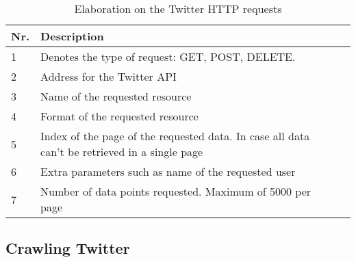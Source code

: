 \begin{table}[H] 
\begin{centering}
\begin{tabular}{|l|p{9cm}|l|}
Nr.			&	Description 		\\\hline
1			&	Denotes the type of request: GET, POST, DELETE. 					\\\hline
2			&	Address for the Twitter API					\\\hline
3			&	Name of the requested resource					\\\hline
4			&	Format of the requested resource					\\\hline
5			&	Index of the page of the requested data. In case all data can't be
retrieved in a single page \\\hline 
6			&	Extra parameters such as name of the requested user					\\\hline
7			&	Number of data points requested. Maximum of 5000 per page					\\\hline
\end{tabular}
\caption{Elaboration on the Twitter HTTP requests}
\label{httpElaboration}
\end{centering}
\end{table}











\subsection{Crawling Twitter}
